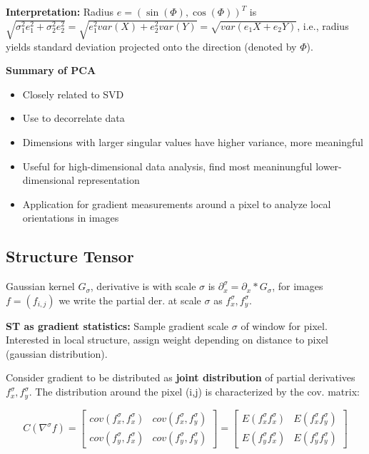 \textbf{Interpretation:} Radius $e = (\sin(\Phi),\cos(\Phi))^T$ is $\sqrt{\sigma_1^2e_1^2+\sigma_2^2e_2^2} = \sqrt{e_1^2 var(X) + e_2^2 var(Y)} = \sqrt{var(e_1X+e_2Y)}$, i.e., radius yields standard deviation projected onto the direction (denoted by $\Phi$).

\textbf{Summary of PCA}

\begin{itemize}
    \item Closely related to SVD
    \item Use to decorrelate data
    \item Dimensions with larger singular values have higher variance, more meaningful
    \item Useful for high-dimensional data analysis, find most meaninungful lower-dimensional representation
    \item Application for gradient measurements around a pixel to analyze local orientations in images
\end{itemize}

\subsection{Structure Tensor}

Gaussian kernel $G_\sigma$, derivative is with scale $\sigma$ is $\partial_x^\sigma = \partial_x * G_\sigma$, for images $f = (f_{i,j})$ we write the partial der. at scale $\sigma$ as $f_x^\sigma, f_y^\sigma$.

\textbf{ST as gradient statistics:} Sample gradient scale $\sigma$ of window for pixel. Interested in local structure, assign weight depending on distance to pixel (gaussian distribution).

Consider gradient to be distributed as \textbf{joint distribution} of partial derivatives $f_x^\sigma, f_y^\sigma$. The distribution around the pixel (i,j) is characterized by the cov. matrix:

$$C(\nabla^\sigma f) = \left[
\begin{matrix}
cov(f_x^\sigma , f_x^\sigma) & cov(f_x^\sigma , f_y^\sigma) \\
cov(f_y^\sigma , f_x^\sigma) & cov(f_y^\sigma , f_y^\sigma)
\end{matrix}\right] = \left[
\begin{matrix}
E(f_x^\sigma f_x^\sigma) & E(f_x^\sigma f_y^\sigma) \\
E(f_y^\sigma f_x^\sigma) & E(f_y^\sigma f_y^\sigma)
\end{matrix}\right]$$

